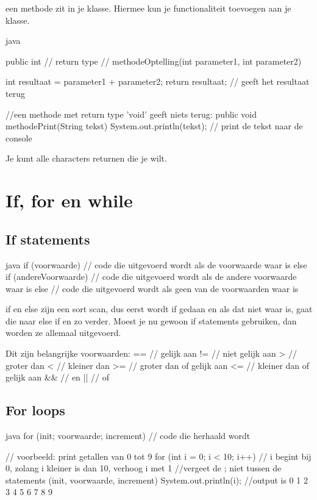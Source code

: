 \documentclass[a4paper,11pt]{article}
\begin{document}
een methode zit in je klasse. Hiermee
kun je functionaliteit toevoegen aan je klasse.

\begin{codeblock}{java}

    public int // return type // methodeOptelling(int parameter1, int parameter2) 
    {  
        int resultaat = parameter1 + parameter2;
        return resultaat; // geeft het resultaat terug

    }

    //een methode met return type 'void' geeft niets terug:
    public void methodePrint(String tekst) 
    {  
        System.out.println(tekst); // print de tekst naar de console
    }

    Je kunt alle characters returnen die je wilt.
\end{codeblock}

\section{If, for en while}
\subsection{If statements}
\begin{codeblock}[if statement]{java}
    if (voorwaarde) {
        // code die uitgevoerd wordt als de voorwaarde waar is
    } else if (andereVoorwaarde) 
    {
        // code die uitgevoerd wordt als de andere voorwaarde waar is
    } else 
    {
        // code die uitgevoerd wordt als geen van de voorwaarden waar is
    }

    if en else zijn een sort scan, dus eerst wordt if gedaan en als
    dat niet waar is, gaat die naar else if en zo verder.
    Moest je nu gewoon if statements gebruiken, dan worden ze allemaal
    uitgevoerd.

    Dit zijn belangrijke voorwaarden:
    ==  // gelijk aan
    !=  // niet gelijk aan
    >   // groter dan
    <   // kleiner dan
    >=  // groter dan of gelijk aan
    <=  // kleiner dan of gelijk aan
    &&  // en
    ||  // of
\end{codeblock}

\subsection{For loops}
\begin{codeblock}{java}
    for (init; voorwaarde; increment) 
    {
        // code die herhaald wordt
    }

    // voorbeeld: print getallen van 0 tot 9
    for (int i = 0; i < 10; i++) // i begint bij 0, zolang i kleiner is dan 10, verhoog i met 1
    //vergeet de ; niet tussen de statements (init, voorwaarde, increment)
    {
        System.out.println(i); //output is 0 1 2 3 4 5 6 7 8 9
    }
\end{codeblock}
\end{document}
